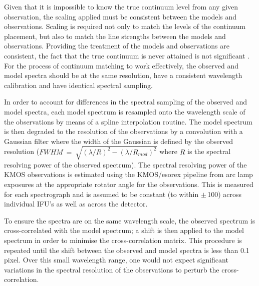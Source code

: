 

Given that it is impossible to know the true continuum level from any given observation,
the scaling applied must be consistent between the models and observations.
Scaling is required not only to match the levels of the continuum placement, but also to match the line strengths between the models and observations.
Providing the treatment of the models and observations are consistent, the fact that the true continuum is never attained is not significant
\citep{2014ApJ...788...58G}.
For the process of continuum matching to work effectively,
the observed and model spectra should be at the same resolution,
have a consistent wavelength calibration and have identical spectral sampling.

In order to account for differences in the spectral sampling of the observed and model spectra,
each model spectrum is resampled onto the wavelength scale of the observations by means of a spline interpolation routine.
The model spectrum is then degraded to the resolution of the observations by a
convolution with a Gaussian filter where the width of the Gaussian is defined by the observed resolution ($FWHM~=~\sqrt{(\lambda/R)^{2} -(\lambda/R_{mod})^{2}}$ where $R$ is the spectral resolving power of the observed spectrum).
The spectral resolving power of the KMOS observations is estimated using the KMOS/esorex pipeline from arc lamp exposures at the appropriate rotator angle for the observations.
This is measured for each spectrograph and is assumed to be constant (to within $\pm$\,100) across individual IFU's as well as across the detector.

To ensure the spectra are on the same wavelength scale, the observed spectrum is cross-correlated with the model spectrum;
a shift is then applied to the model spectrum in order to minimise the cross-correlation matrix.
This procedure is repeated until the shift between the observed and model spectra is less than 0.1\,pixel.
Over this small wavelength range, one would not expect significant variations in the spectral resolution of the observations to perturb the cross-correlation.

